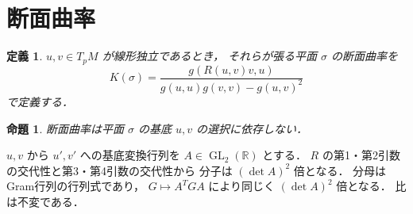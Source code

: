 \documentclass[a5paper,10pt,onecolumn]{jsarticle}
\makeatletter
\theoremstyle{mathnotetheorem}
\newtheorem{definition}[theorem]{定義}
\newtheorem{proposition}[theorem]{命題}
\renewcommand{\proofname}{証明}
\renewenvironment{proof}[1][\proofname]{%
  \par\pushQED{\qed}\normalfont\topsep4\p@\@plus2\p@\relax
  \trivlist\item[\hskip\labelsep\bfseries #1]\ignorespaces
}{\popQED\endtrivlist\@endpefalse}
\makeatother
\begin{document}
\section{断面曲率}
\begin{definition}
$u,v\in T_pM$ が線形独立であるとき，
それらが張る平面 $\sigma$ の断面曲率を
\[
 K(\sigma)=
 \frac{g(R(u,v)v,u)}
 {g(u,u)g(v,v)-g(u,v)^2}
\]
で定義する．
\end{definition}
\begin{proposition}
断面曲率は平面 $\sigma$ の基底 $u,v$ の選択に依存しない．
\end{proposition}
\begin{proof}
$u,v$ から $u',v'$ への基底変換行列を
$A\in\operatorname{GL}_2(\mathbb R)$ とする．
$R$ の第1・第2引数の交代性と第3・第4引数の交代性から
分子は $(\det A)^2$ 倍となる．
分母はGram行列の行列式であり，
$G\mapsto A^TGA$ により同じく $(\det A)^2$ 倍となる．
比は不変である．
\end{proof}
\end{document}
